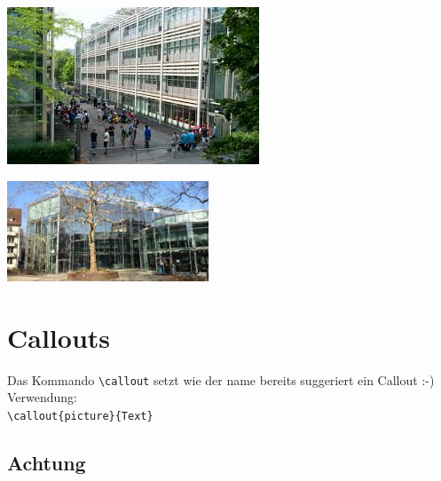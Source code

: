 \blindtext

\begin{addmargin}[-\marginWidthPlusSep]{0pt}
   	\includegraphics[width=\dimexpr\textwidth+\marginWidthPlusSep]{Kapitel/Bilder/gibbBmSchulhausMitSchuelern}
   	\label{fig:figur2}    	
\end{addmargin}


\begin{addmargin}[-\marginWidthPlusSep]{0pt}
	\begin{minipage}{60mm}
		\includegraphics[width=60mm]{Kapitel/Bilder/gibbiet}
		\label{fig:Testbild3}
	\end{minipage}\hfill
	\begin{minipage}{\dimexpr\textwidth+\marginWidthPlusSep-70mm} %
		\blindtext
	\end{minipage}   	
\end{addmargin}

\section{Callouts}

Das Kommando \lstinline$\callout$ setzt wie der name bereits suggeriert ein Callout :-)\\
Verwendung:\\
\lstinline$\callout{picture}{Text}$

\subsection{Achtung}

